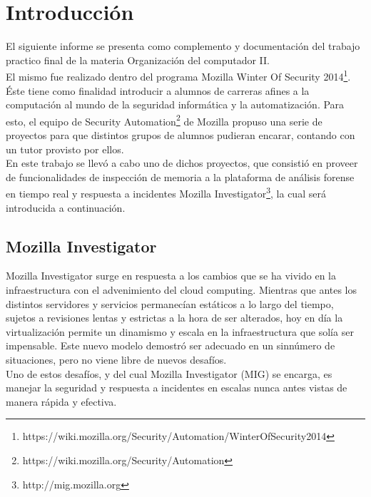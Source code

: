 \section{Introducción}

El siguiente informe se presenta como complemento y documentación del trabajo
practico final de la materia Organización del computador II.\\

El mismo fue realizado dentro del programa Mozilla Winter Of Security
2014\footnote{https://wiki.mozilla.org/Security/Automation/WinterOfSecurity2014}.
Éste tiene como finalidad introducir a alumnos de carreras afines a la
computación al mundo de la seguridad informática y la automatización. Para
esto, el equipo de Security
Automation\footnote{https://wiki.mozilla.org/Security/Automation} de Mozilla
propuso una serie de proyectos para que distintos grupos de alumnos pudieran
encarar, contando con un tutor provisto por ellos.\\

En este trabajo se llevó a cabo uno de dichos proyectos, que consistió en
proveer de funcionalidades de inspección de memoria a la plataforma de análisis
forense en tiempo real y respuesta a incidentes Mozilla
Investigator\footnote{http://mig.mozilla.org}, la cual será introducida a
continuación.\\

\subsection{Mozilla Investigator}

Mozilla Investigator surge en respuesta a los cambios que se ha vivido en la
infraestructura con el advenimiento del cloud computing. Mientras que
antes los distintos servidores y servicios permanecían estáticos a lo largo del
tiempo, sujetos a revisiones lentas y estrictas a la hora de ser alterados, hoy
en día la virtualización permite un dinamismo y escala en la infraestructura
que solía ser impensable. Este nuevo modelo demostró ser adecuado en un sinnúmero
de situaciones, pero no viene libre de nuevos desafíos.\\

Uno de estos desafíos, y del cual Mozilla Investigator (MIG) se encarga, es
manejar la seguridad y respuesta a incidentes en escalas nunca antes
vistas de manera rápida y efectiva.\\

